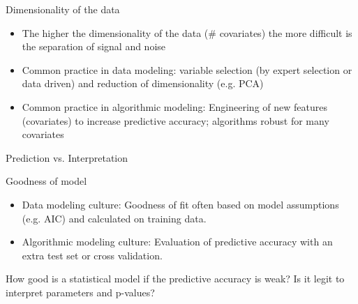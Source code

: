 \documentclass[compress]{beamer}
\begin{document}
\begin{frame}{Dimensionality of the data}
  \begin{itemize}
  \item The higher the dimensionality of the data (\# covariates) the more difficult is the separation of signal and noise
  \item Common practice in data modeling: variable selection (by expert selection or data driven) and reduction of dimensionality (e.g. PCA)
  \item Common practice in algorithmic modeling: Engineering of new features (covariates) to increase predictive accuracy; algorithms robust for many covariates
  \end{itemize}
\end{frame}


\begin{frame}{Prediction vs. Interpretation}
\end{frame}


\begin{frame}{Goodness of model}
  \begin{itemize}
  \item Data modeling culture: Goodness of fit often based on model assumptions (e.g. AIC) and calculated on training data.
  \item Algorithmic modeling culture: Evaluation of predictive accuracy with an extra test set or cross validation.
  \end{itemize}
  How good is a statistical model if the predictive accuracy is weak? Is it legit to interpret parameters and p-values?
\end{frame}
\end{document}
